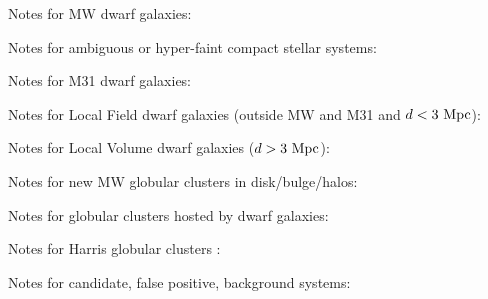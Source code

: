 
Notes for MW dwarf galaxies:
\begin{itemize}



\end{itemize}

Notes for ambiguous or hyper-faint compact stellar systems:
\begin{itemize}



\end{itemize}

Notes for M31 dwarf galaxies:
\begin{itemize}



\end{itemize}


Notes for Local Field  dwarf galaxies (outside MW and M31 and $d < 3~{\rm Mpc}$):
\begin{itemize}



\end{itemize}

Notes for Local Volume  dwarf galaxies ($d > 3~{\rm Mpc}$):
\begin{itemize}



\end{itemize}

Notes for new MW globular clusters  in disk/bulge/halos:
\begin{itemize}



\end{itemize}

Notes for  globular clusters hosted by dwarf galaxies:
\begin{itemize}



\end{itemize}

Notes for Harris globular clusters \citep{Harris1996AJ....112.1487H}:
\begin{itemize}



\end{itemize}

Notes for candidate, false positive, background systems:
\begin{itemize}



\end{itemize}